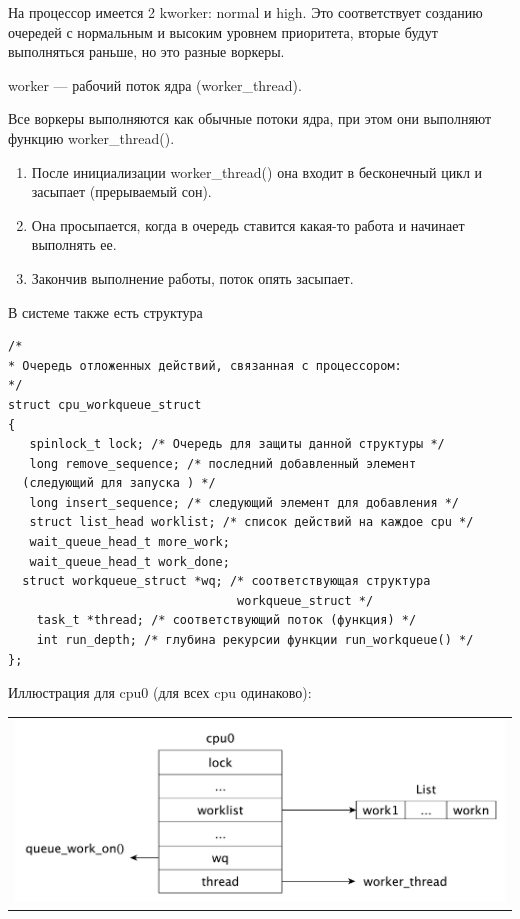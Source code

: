 На процессор имеется 2 kworker: normal и high. Это соответствует созданию очередей с нормальным и высоким уровнем приоритета, вторые будут выполняться раньше, но это разные воркеры.

worker --- рабочий поток ядра (worker\_thread).

Все воркеры выполняются как обычные потоки ядра, при этом они выполняют функцию worker\_thread().
\begin{enumerate}
	\item После инициализации worker\_thread() она входит в бесконечный цикл и засыпает (прерываемый сон).
	\item Она просыпается, когда в очередь ставится какая-то работа и начинает выполнять ее.
	\item Закончив выполнение работы, поток опять засыпает.
\end{enumerate}

В системе также есть структура

\begin{lstlisting}
/*
* Очередь отложенных действий, связанная с процессором:
*/
struct cpu_workqueue_struct 
{
   spinlock_t lock; /* Очередь для защиты данной структуры */
   long remove_sequence; /* последний добавленный элемент
  (следующий для запуска ) */
   long insert_sequence; /* следующий элемент для добавления */
   struct list_head worklist; /* список действий на каждое cpu */
   wait_queue_head_t more_work;
   wait_queue_head_t work_done;
  struct workqueue_struct *wq; /* соответствующая структура
                                workqueue_struct */
    task_t *thread; /* соответствующий поток (функция) */
    int run_depth; /* глубина рекурсии функции run_workqueue() */
};
\end{lstlisting}

Иллюстрация для cpu0 (для всех cpu одинаково):

\begin{table}[h!]
  \centering
  \begin{tabular}{p{1\linewidth}}
    \centering
    \includegraphics[width=0.8\linewidth]{./images/cpu0.pdf}
  \end{tabular}
\end{table}

